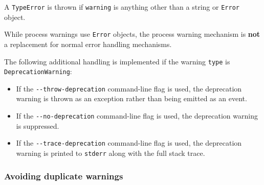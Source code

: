 \begin{Shaded}
\begin{Highlighting}[]
\OperatorTok{=} \NormalTok{(}\NormalTok{)}\OperatorTok{;}

\OperatorTok{=}  \NormalTok{(}\NormalTok{)}\OperatorTok{;}
 \OperatorTok{=} \OperatorTok{;}
 \OperatorTok{=} \OperatorTok{;}

\OperatorTok{;}
\end{Highlighting}
\end{Shaded}

A \texttt{TypeError} is thrown if \texttt{warning} is anything other
than a string or \texttt{Error} object.

While process warnings use \texttt{Error} objects, the process warning
mechanism is \textbf{not} a replacement for normal error handling
mechanisms.

The following additional handling is implemented if the warning
\texttt{type} is
\texttt{\textquotesingle{}DeprecationWarning\textquotesingle{}}:

\begin{itemize}
\tightlist
\item
  If the \texttt{-\/-throw-deprecation} command-line flag is used, the
  deprecation warning is thrown as an exception rather than being
  emitted as an event.
\item
  If the \texttt{-\/-no-deprecation} command-line flag is used, the
  deprecation warning is suppressed.
\item
  If the \texttt{-\/-trace-deprecation} command-line flag is used, the
  deprecation warning is printed to \texttt{stderr} along with the full
  stack trace.
\end{itemize}

\subsubsection{Avoiding duplicate
warnings}\label{avoiding-duplicate-warnings}

